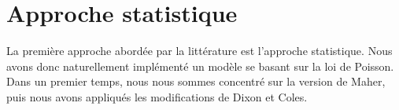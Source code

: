 \chapter{Approche statistique}
La première approche abordée par la littérature est l'approche statistique. 
Nous avons donc naturellement implémenté un modèle se basant sur la loi de 
Poisson. Dans un premier temps, nous nous sommes concentré sur la version de Maher, 
puis nous avons appliqués les modifications de Dixon et Coles. 






